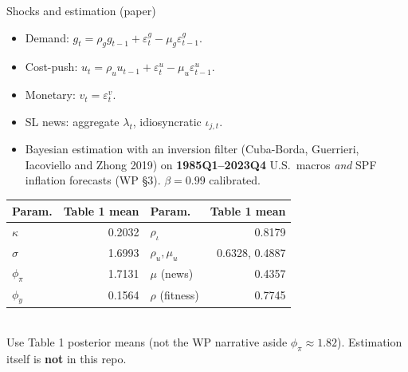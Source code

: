 \documentclass[11pt,aspectratio=169]{beamer}
\begin{document}
\begin{frame}{Shocks and estimation (paper)}
  \begin{itemize}
    \item Demand: $g_t=\rho_g g_{t-1}+\varepsilon_t^g-\mu_g\varepsilon_{t-1}^g$.
    \item Cost-push: $u_t=\rho_u u_{t-1}+\varepsilon_t^u-\mu_u\varepsilon_{t-1}^u$.
    \item Monetary: $v_t=\varepsilon_t^v$.
    \item SL news: aggregate $\lambda_t$, idiosyncratic $\iota_{j,t}$.
    \item Bayesian estimation with an inversion filter
          (Cuba-Borda, Guerrieri, Iacoviello and Zhong 2019) on
          \textbf{1985Q1--2023Q4} U.S.\ macros \emph{and} SPF inflation
          forecasts (WP \S3). $\beta=0.99$ calibrated.
  \end{itemize}
  \vspace{0.3em}
  {\footnotesize
  \begin{tabular}{@{}lrlr@{}}
    \toprule
    Param. & Table 1 mean & Param. & Table 1 mean \\
    \midrule
    $\kappa$ & 0.2032 & $\rho_\iota$ & 0.8179 \\
    $\sigma$ & 1.6993 & $\rho_u,\mu_u$ & 0.6328, 0.4887 \\
    $\phi_\pi$ & 1.7131 & $\mu$ (news) & 0.4357 \\
    $\phi_y$ & 0.1564 & $\rho$ (fitness) & 0.7745 \\
    \bottomrule
  \end{tabular}
  }\\[0.4em]
  {\scriptsize Use Table 1 posterior means (not the WP narrative aside
  $\phi_\pi\approx 1.82$). Estimation itself is \textbf{not} in this repo.}
\end{frame}

\end{document}
